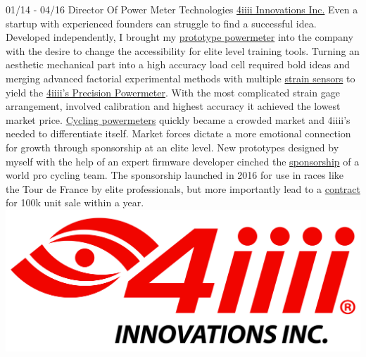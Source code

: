 \documentclass[]{friggeri-cv}
\begin{document}
\begin{entrylist}
  \wentry
    {01/14 - 04/16}
    {Director Of Power Meter Technologies}
    {\href{https://www.4iiii.com}{4iiii Innovations Inc.}}
    {Even a startup with experienced founders can struggle to find a successful idea. Developed independently, I brought my \href{http://keithhack.blogspot.com/2013/09/prelude-to-launching-beta-test.html}{prototype powermeter} into the company with the desire to change the accessibility for elite level training tools. Turning an aesthetic mechanical part into a high accuracy load cell required bold ideas and merging advanced factorial experimental methods with multiple \href{https://en.wikipedia.org/wiki/Strain_gauge}{strain sensors} to yield the \href{https://4iiii-innovations.myshopify.com/collections/power-meters/products/precision-pro-ride-ready}{4iiii's Precision Powermeter}. With the most complicated strain gage arrangement, involved calibration and highest accuracy it achieved the lowest market price.
\href{https://en.wikipedia.org/wiki/Cycling_power_meter}{Cycling powermeters} quickly became a crowded market and 4iiii's needed to differentiate itself. Market forces dictate a more emotional connection for growth through sponsorship at an elite level. New prototypes designed by myself with the help of an expert firmware developer cinched the  \href{https://4iiii.com/proteam-precision-20160107/}{sponsorship} of a world pro cycling team. The sponsorship launched in 2016 for use in races like the Tour de France by elite professionals, but more importantly lead to a \href{https://www.specialized.com/us/en/stories/power-cranks}{contract} for 100k unit sale within a year.}
	{\includegraphics[scale=0.016]{img/4iiii_large.jpg}}


\end{entrylist}
\end{document}
